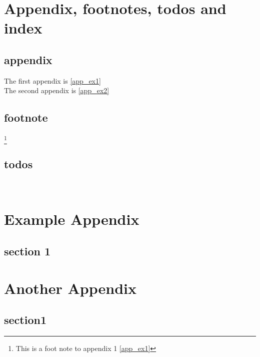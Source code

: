 \chapter{Appendix, footnotes, todos and index}

\section{appendix}
The first appendix is \autoref{app_ex1}\\

The second appendix is \autoref{app_ex2}

\section{footnote}
\footnote{This is a foot note to appendix 1 \autoref{app_ex1}}


\section{todos}
\ 




\begin{appendix}
    \chapter{Example Appendix}
    \label{app_ex1}

    \section{section 1}


    \chapter{Another Appendix}
    \label{app_ex2}

    \section {section1}
\end{appendix}